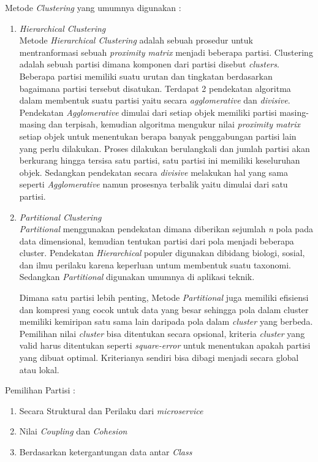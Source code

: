 Metode \textit{Clustering} yang umumnya digunakan \cite{10}:
\begin{enumerate}[leftmargin=1.3cm]
	\item \textit{Hierarchical Clustering} \\
	Metode \textit{Hierarchical Clustering} adalah sebuah prosedur untuk mentranformasi sebuah \textit{proximity matrix} menjadi beberapa partisi. Clustering adalah sebuah partisi dimana komponen dari partisi disebut \textit{clusters}. Beberapa partisi memiliki suatu urutan dan tingkatan berdasarkan bagaimana partisi tersebut disatukan. Terdapat 2 pendekatan algoritma dalam membentuk suatu partisi yaitu secara \textit{agglomerative} dan \textit{divisive}. 
	Pendekatan \textit{Agglomerative} dimulai dari setiap objek memiliki partisi masing-masing dan terpisah, kemudian algoritma mengukur nilai \textit{proximity matrix} setiap objek untuk menentukan berapa banyak penggabungan partisi lain yang perlu dilakukan. Proses dilakukan berulangkali dan jumlah partisi akan berkurang hingga tersisa satu partisi, satu partisi ini memiliki keseluruhan objek. Sedangkan pendekatan secara \textit{divisive} melakukan hal yang sama seperti \textit{Agglomerative} namun prosesnya terbalik yaitu dimulai dari satu partisi.
	\item \textit{Partitional Clustering} \\
	\textit{Partitional} menggunakan pendekatan dimana diberikan sejumlah \textit{n} pola pada data dimensional, kemudian tentukan partisi dari pola menjadi beberapa cluster. Pendekatan \textit{Hierarchical} populer digunakan dibidang biologi, sosial, dan ilmu perilaku karena keperluan untum membentuk suatu taxonomi. Sedangkan \textit{Partitional} digunakan umumnya di aplikasi teknik. 
	
	Dimana satu partisi lebih penting, Metode \textit{Partitional} juga memiliki efisiensi dan kompresi yang cocok untuk data yang besar sehingga pola dalam cluster memiliki kemiripan satu sama lain daripada pola dalam \textit{cluster} yang berbeda. Pemilihan nilai \textit{cluster} bisa ditentukan secara opsional, kriteria \textit{cluster} yang valid harus ditentukan seperti \textit{square-error} untuk menentukan apakah partisi yang dibuat optimal. Kriterianya sendiri bisa dibagi menjadi secara global atau lokal.  

\end{enumerate}	
Pemilihan Partisi \cite{15}:	
\begin{enumerate}[leftmargin=1.3cm]
	\item Secara Struktural dan Perilaku dari \textit{microservice}
	\item Nilai \textit{Coupling} dan \textit{Cohesion}
	\item Berdasarkan ketergantungan data antar \textit{Class}
\end{enumerate}	

